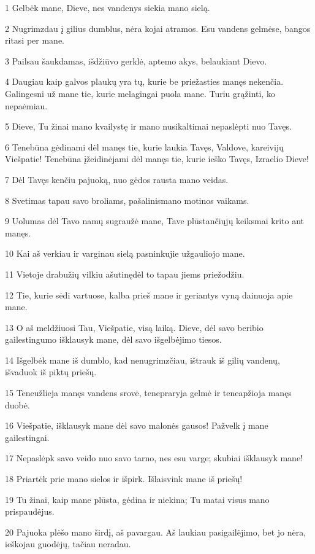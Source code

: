 \par 1 Gelbėk mane, Dieve, nes vandenys siekia mano sielą. 
\par 2 Nugrimzdau į gilius dumblus, nėra kojai atramos. Esu vandens gelmėse, bangos ritasi per mane. 
\par 3 Pailsau šaukdamas, išdžiūvo gerklė, aptemo akys, belaukiant Dievo. 
\par 4 Daugiau kaip galvos plaukų yra tų, kurie be priežasties manęs nekenčia. Galingesni už mane tie, kurie melagingai puola mane. Turiu grąžinti, ko nepaėmiau. 
\par 5 Dieve, Tu žinai mano kvailystę ir mano nusikaltimai nepaslėpti nuo Tavęs. 
\par 6 Tenebūna gėdinami dėl manęs tie, kurie laukia Tavęs, Valdove, kareivijų Viešpatie! Tenebūna įžeidinėjami dėl manęs tie, kurie ieško Tavęs, Izraelio Dieve! 
\par 7 Dėl Tavęs kenčiu pajuoką, nuo gėdos rausta mano veidas. 
\par 8 Svetimas tapau savo broliams, pašalinis­mano motinos vaikams. 
\par 9 Uolumas dėl Tavo namų sugraužė mane, Tave plūstančiųjų keiksmai krito ant manęs. 
\par 10 Kai aš verkiau ir varginau sielą pasninku­jie užgauliojo mane. 
\par 11 Vietoje drabužių vilkiu ašutinę­dėl to tapau jiems priežodžiu. 
\par 12 Tie, kurie sėdi vartuose, kalba prieš mane ir geriantys vyną dainuoja apie mane. 
\par 13 O aš meldžiuosi Tau, Viešpatie, visą laiką. Dieve, dėl savo beribio gailestingumo išklausyk mane, dėl savo išgelbėjimo tiesos. 
\par 14 Išgelbėk mane iš dumblo, kad nenugrimzčiau, ištrauk iš gilių vandenų, išvaduok iš piktų priešų. 
\par 15 Teneužlieja manęs vandens srovė, tenepraryja gelmė ir teneapžioja manęs duobė. 
\par 16 Viešpatie, išklausyk mane dėl savo malonės gausos! Pažvelk į mane gailestingai. 
\par 17 Nepaslėpk savo veido nuo savo tarno, nes esu varge; skubiai išklausyk mane! 
\par 18 Priartėk prie mano sielos ir išpirk. Išlaisvink mane iš priešų! 
\par 19 Tu žinai, kaip mane plūsta, gėdina ir niekina; Tu matai visus mano prispaudėjus. 
\par 20 Pajuoka plėšo mano širdį, aš pavargau. Aš laukiau pasigailėjimo, bet jo nėra, ieškojau guodėjų, tačiau neradau. 

